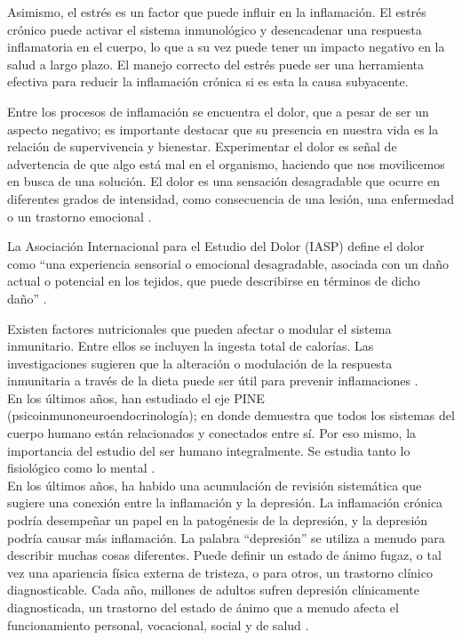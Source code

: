 \documentclass[jou]{apa7}
\begin{document}
	Asimismo, el estrés es un factor que puede influir en la inflamación. El
	estrés crónico puede activar el sistema inmunológico y desencadenar una
	respuesta inflamatoria en el cuerpo, lo que a su vez puede tener un
	impacto negativo en la salud a largo plazo. El manejo correcto del
	estrés puede ser una herramienta efectiva para reducir la inflamación
	crónica si es esta la causa subyacente.
	
	Entre los procesos de inflamación se encuentra el dolor, que a pesar de
	ser un aspecto negativo; es importante destacar que su presencia en
	nuestra vida es la relación de supervivencia y bienestar. Experimentar
	el dolor es señal de advertencia de que algo está mal en el organismo,
	haciendo que nos movilicemos en busca de una solución. El dolor es una
	sensación desagradable que ocurre en diferentes grados de intensidad,
	como consecuencia de una lesión, una enfermedad o un trastorno emocional
	\parencite{Farlex2023}.
	
	
	La Asociación Internacional para el Estudio del Dolor (IASP) define el dolor como ``una experiencia sensorial o emocional desagradable, asociada con un daño actual o potencial en los tejidos, que puede describirse en términos de dicho daño'' \parencite{PainTermsList1979}. 
	
	
	Existen factores nutricionales que pueden afectar o modular el sistema
	inmunitario. Entre ellos se incluyen la ingesta total de calorías. Las
	investigaciones sugieren que la alteración o modulación de la respuesta
	inmunitaria a través de la dieta puede ser útil para prevenir
	inflamaciones \parencite{GarciaCasal2014}.\\
	
	En los últimos años, han estudiado el eje PINE
	(psicoinmunoneuroendocrinología); en donde demuestra que todos los
	sistemas del cuerpo humano están relacionados y conectados entre sí. Por
	eso mismo, la importancia del estudio del ser humano integralmente. Se
	estudia tanto lo fisiológico como lo mental \parencite{Osimo2019}.\\
	
	En los últimos años, ha habido una acumulación de revisión sistemática
	que sugiere una conexión entre la inflamación y la depresión. La
	inflamación crónica podría desempeñar un papel en la patogénesis de la
	depresión, y la depresión podría causar más inflamación. La palabra
	``depresión'' se utiliza a menudo para describir muchas cosas
	diferentes. Puede definir un estado de ánimo fugaz, o tal vez una
	apariencia física externa de tristeza, o para otros, un trastorno
	clínico diagnosticable. Cada año, millones de adultos sufren depresión
	clínicamente diagnosticada, un trastorno del estado de ánimo que a
	menudo afecta el funcionamiento personal, vocacional, social y de salud
	\parencite{APA2014}.
	
\end{document}
